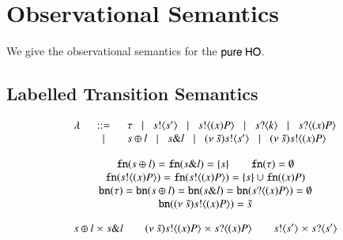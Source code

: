 \section{Observational Semantics}

We give the observational semantics for the $\mathsf{pure\ HO}$.

\subsection{Labelled Transition Semantics}

\[
	\begin{array}{rcl}
		\lambda &\;\;::=\;\;& \tau \;\;\;|\;\;\; s ! \langle s' \rangle \;\;\;|\;\;\; s ! \langle (x)P \rangle \;\;\;|\;\;\; s ? \langle k \rangle \;\;\;|\;\;\; s ? \langle (x)P \rangle \\
		&	\;\;\;|\;\;\; & s \oplus l \;\;\;|\;\;\; s \& l \;\;\;|\;\;\; (\nu\ \tilde{s}) s ! \langle s' \rangle \;\;\;|\;\;\; (\nu\ \tilde{s}) s ! \langle (x)P \rangle\\
	\end{array}
\]

\[
	\begin{array}{c}
		\mathtt{fn}(s \oplus l) = \mathtt{fn}(s \& l) = \{s\} \qquad \mathtt{fn}(\tau) = \emptyset \\ 
		\mathtt{fn}(s ! \langle (x)P \rangle) = \mathtt{fn}(s ! \langle (x)P \rangle) = \{s\} \cup \mathtt{fn}((x)P)\\
		\mathtt{bn}(\tau) = \mathtt{bn}(s \oplus l) = \mathtt{bn}(s \& l) = \mathtt{bn}(s ? \langle (x)P \rangle) = \emptyset\\
		\mathtt{bn}((\nu\ \tilde{s}) s ! \langle (x)P \rangle) = \tilde{s}
	\end{array}
\]

\[
	s \oplus l \asymp s \& l \qquad (\nu\ \tilde{s}) s ! \langle (x)P \rangle \asymp s ? \langle (x)P \rangle \qquad s ! \langle s' \rangle \asymp s ? \langle s' \rangle
\]



